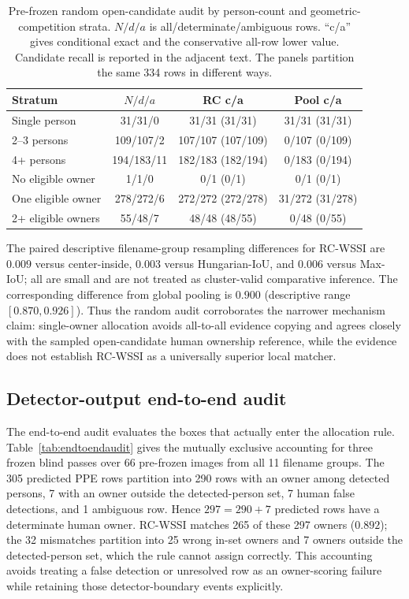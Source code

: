 \documentclass[iicol,pdflatex,sn-mathphys-num]{sn-jnl}
\begin{document}
\begin{table}[t]
\caption{Pre-frozen random open-candidate audit by person-count and geometric-competition strata. $N/d/a$ is all/determinate/ambiguous rows. ``c/a'' gives conditional exact and the conservative all-row lower value. Candidate recall is reported in the adjacent text. The panels partition the same 334 rows in different ways.}
\label{tab:randomauditstrata}
\centering
\scriptsize
\setlength{\tabcolsep}{1.5pt}
\begin{tabular}{@{}l c c c@{}}
\toprule
Stratum & $N/d/a$ & RC c/a & Pool c/a \\
\midrule
Single person & 31/31/0 & 31/31 (31/31) & 31/31 (31/31) \\
2--3 persons & 109/107/2 & 107/107 (107/109) & 0/107 (0/109) \\
4+ persons & 194/183/11 & 182/183 (182/194) & 0/183 (0/194) \\
\midrule
No eligible owner & 1/1/0 & 0/1 (0/1) & 0/1 (0/1) \\
One eligible owner & 278/272/6 & 272/272 (272/278) & 31/272 (31/278) \\
2+ eligible owners & 55/48/7 & 48/48 (48/55) & 0/48 (0/55) \\
\bottomrule
\end{tabular}
\end{table}

The paired descriptive filename-group resampling differences for RC-WSSI are $0.009$ versus center-inside, $0.003$ versus Hungarian-IoU, and $0.006$ versus Max-IoU; all are small and are not treated as cluster-valid comparative inference. The corresponding difference from global pooling is $0.900$ (descriptive range $[0.870,0.926]$). Thus the random audit corroborates the narrower mechanism claim: single-owner allocation avoids all-to-all evidence copying and agrees closely with the sampled open-candidate human ownership reference, while the evidence does not establish RC-WSSI as a universally superior local matcher.

\subsection{Detector-output end-to-end audit}
The end-to-end audit evaluates the boxes that actually enter the allocation rule. Table~\ref{tab:endtoendaudit} gives the mutually exclusive accounting for three frozen blind passes over 66 pre-frozen images from all 11 filename groups. The 305 predicted PPE rows partition into 290 rows with an owner among detected persons, 7 with an owner outside the detected-person set, 7 human false detections, and 1 ambiguous row. Hence $297=290+7$ predicted rows have a determinate human owner. RC-WSSI matches 265 of these 297 owners ($0.892$); the 32 mismatches partition into 25 wrong in-set owners and 7 owners outside the detected-person set, which the rule cannot assign correctly. This accounting avoids treating a false detection or unresolved row as an owner-scoring failure while retaining those detector-boundary events explicitly.
\end{document}
